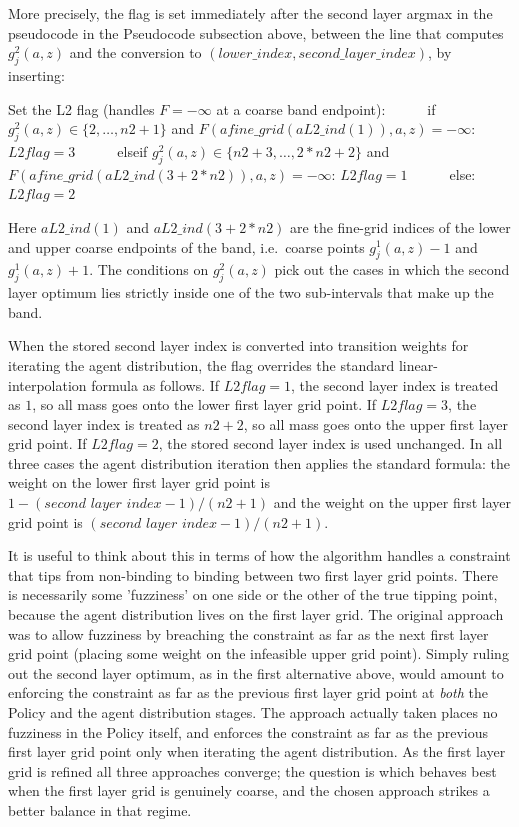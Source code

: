 \documentclass[11pt,fleqn]{article}
\begin{document}
More precisely, the flag is set immediately after the second layer argmax in the pseudocode in the Pseudocode subsection above, between the line that computes $g^2_{j}(a,z)$ and the conversion to $(lower\_{}index, second\_{}layer\_{}index)$, by inserting:
\begin{algorithmic}
\State Set the L2 flag (handles $F=-\infty$ at a coarse band endpoint):
\State $\quad$ $\quad$ if $g^2_{j}(a,z)\in\{2,\dots,n2+1\}$ and $F(afine\_{}grid(aL2\_{}ind(1)),a,z)=-\infty$: $L2flag=3$
\State $\quad$ $\quad$ elseif $g^2_{j}(a,z)\in\{n2+3,\dots,2*n2+2\}$ and $F(afine\_{}grid(aL2\_{}ind(3+2*n2)),a,z)=-\infty$: $L2flag=1$
\State $\quad$ $\quad$ else: $L2flag=2$
\end{algorithmic}
\noindent Here $aL2\_{}ind(1)$ and $aL2\_{}ind(3+2*n2)$ are the fine-grid indices of the lower and upper coarse endpoints of the band, i.e.\ coarse points $g^1_{j}(a,z)-1$ and $g^1_{j}(a,z)+1$. The conditions on $g^2_{j}(a,z)$ pick out the cases in which the second layer optimum lies strictly inside one of the two sub-intervals that make up the band.

When the stored second layer index is converted into transition weights for iterating the agent distribution, the flag overrides the standard linear-interpolation formula as follows. If $L2flag=1$, the second layer index is treated as $1$, so all mass goes onto the lower first layer grid point. If $L2flag=3$, the second layer index is treated as $n2+2$, so all mass goes onto the upper first layer grid point. If $L2flag=2$, the stored second layer index is used unchanged. In all three cases the agent distribution iteration then applies the standard formula: the weight on the lower first layer grid point is $1-(\textit{second layer index}-1)/(n2+1)$ and the weight on the upper first layer grid point is $(\textit{second layer index}-1)/(n2+1)$.

It is useful to think about this in terms of how the algorithm handles a constraint that tips from non-binding to binding between two first layer grid points. There is necessarily some 'fuzziness' on one side or the other of the true tipping point, because the agent distribution lives on the first layer grid. The original approach was to allow fuzziness by breaching the constraint as far as the next first layer grid point (placing some weight on the infeasible upper grid point). Simply ruling out the second layer optimum, as in the first alternative above, would amount to enforcing the constraint as far as the previous first layer grid point at \textit{both} the Policy and the agent distribution stages. The approach actually taken places no fuzziness in the Policy itself, and enforces the constraint as far as the previous first layer grid point only when iterating the agent distribution. As the first layer grid is refined all three approaches converge; the question is which behaves best when the first layer grid is genuinely coarse, and the chosen approach strikes a better balance in that regime.
\end{document}
